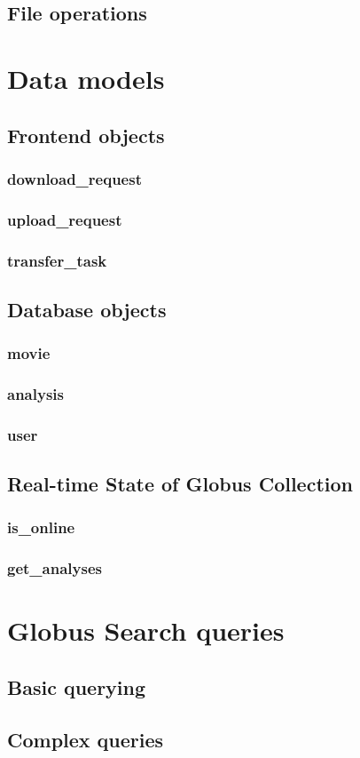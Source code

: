 \documentclass{report}
\begin{document}
\section{File operations}

\chapter{Data models}
\section{Frontend objects}
\subsection{download\_request}
\subsection{upload\_request}
\subsection{transfer\_task}
\section{Database objects}
\subsection{movie}
\subsection{analysis}
\subsection{user}
\section{Real-time State of Globus Collection}
\subsection{is\_online}
\subsection{get\_analyses}

\chapter{Globus Search queries}
\section{Basic querying}
\section{Complex queries}
\end{document}
